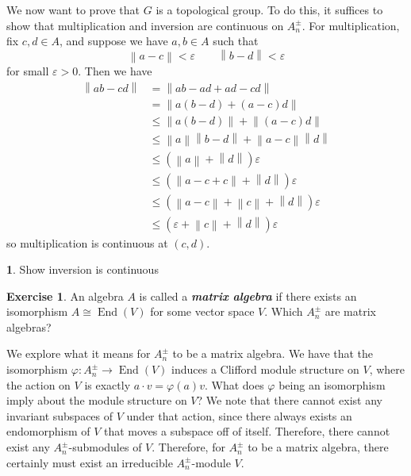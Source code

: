 \documentclass[psamsfonts]{amsart}
\theoremstyle{definition}
\newtheorem{exer}[thm]{Exercise}
\newtheorem{TODO}{\ib{TODO}}
\theoremstyle{remark}
\newcommand{\ib}[1]{\textbf{\textit{#1}}}
\newcommand{\norm}[1]{\left\lVert#1\right\rVert}
\DeclareMathOperator{\End}{End}
\begin{document}
We now want to prove that $G$ is a topological group. To do this, it suffices to show that multiplication and inversion are continuous on $A^\pm_n$. For multiplication, fix $c,d \in A$, and suppose we have $a,b \in A$ such that
$$\norm{a - c} < \varepsilon \qquad \norm{b -d } < \varepsilon $$
for small $\varepsilon > 0$. Then we have 
\begin{align*}
\norm{ab - cd} &= \norm{ab - ad + ad - cd} \\
&= \norm{a(b-d) + (a-c)d} \\
&\leq \norm{a(b-d)} + \norm{(a-c)d} \\
&\leq \norm{a}\norm{b-d} + \norm{a-c}\norm{d} \\
&\leq (\norm{a} + \norm{d})\varepsilon \\
& \leq (\norm{a - c + c} + \norm{d})\varepsilon \\
&\leq (\norm{a - c} + \norm{c} + \norm{d})\varepsilon \\
&\leq (\varepsilon + \norm{c} + \norm{d})\varepsilon
\end{align*}
so multiplication is continuous at $(c,d)$. 
%
\begin{TODO}
Show inversion is continuous
\end{TODO}
%
\begin{exer}
An algebra $A$ is called a \ib{matrix algebra} if there exists an isomorphism $A \cong \End(V)$ for some vector space $V$. Which $A^\pm_n$ are matrix algebras?
\end{exer}
We explore what it means for $A^\pm_n$ to be a matrix algebra. We have that the isomorphism $\varphi: A^\pm_n \to \End(V)$ induces a Clifford module structure on $V$, where the action on $V$ is exactly $a \cdot v = \varphi(a)v$. What does $\varphi$ being an isomorphism imply about the module structure on $V$? We note that there cannot exist any invariant subspaces of $V$ under that action, since there always exists an endomorphism of $V$ that moves a subspace off of itself. Therefore, there cannot exist any $A^\pm_n$-submodules of $V$. Therefore, for $A^\pm_n$ to be a matrix algebra, there certainly must exist an irreducible $A^\pm_n$-module $V$.
\end{document}
